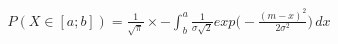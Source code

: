 \documentclass[preview]{standalone}
\begin{document}
\begin{align*}
P( X \in [a;b] ) = { \frac{1}{\sqrt{\pi}} } \times - \int_b^a { { \frac{1}{\sigma \sqrt{2}} } exp\Big(-{ \frac{(m - x)^2}{2 \sigma^2} }\Big) } \, dx
\end{align*}
\end{document}
